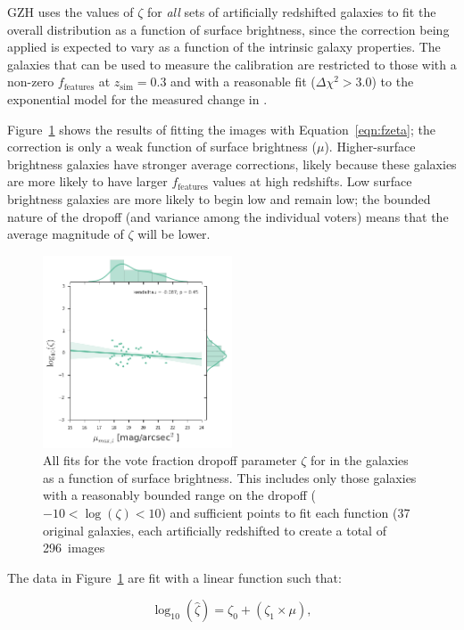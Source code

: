 \documentclass[twocolumn]{aastex6}
\begin{document}
GZH uses the values of $\zeta$ for \emph{all} sets of artificially redshifted
galaxies to fit the overall distribution as a function of surface brightness,
since the correction being applied is expected to vary as a function of the
intrinsic galaxy properties. The galaxies that can be used to measure the
calibration are restricted to those with a non-zero $f_\textrm{features}$ at
$z_\mathrm{sim}=0.3$ and with a reasonable fit ($\Delta \chi^2 > 3.0$) to the
exponential model for the measured change in \ffeatures. 

Figure~\ref{fig:zeta_mu} shows the results of fitting the \ferengi{} images
with Equation~\ref{eqn:fzeta}; the correction is only a weak function of
surface brightness ($\mu$). Higher-surface brightness galaxies have stronger
average corrections, likely because these galaxies are more likely to have
larger $f_\textrm{features}$ values at high redshifts. Low surface brightness
galaxies are more likely to begin low and remain low; the bounded nature of the
dropoff (and variance among the individual voters) means that the average
magnitude of $\zeta$ will be lower. 

\begin{figure}
\center
\includegraphics[width=0.50\textwidth]{figures/zeta_mu.png}
\caption{All fits for the vote fraction dropoff parameter $\zeta$ for
\ffeatures{} in the \ferengi{} galaxies as a function of surface
brightness. This includes only those galaxies with a reasonably bounded range
on the dropoff ($-10<\log(\zeta)<10$) and sufficient points to fit each
function (37 original galaxies, each artificially redshifted to create a total
of 296~images}
\label{fig:zeta_mu}
\end{figure}

The data in Figure~\ref{fig:zeta_mu} are fit with a linear function such that:

\begin{equation}
\log_{10}(\hat\zeta) = \zeta_0 + (\zeta_1 \times \mu),
\label{eqn:zetafit}
\end{equation}
\end{document}

